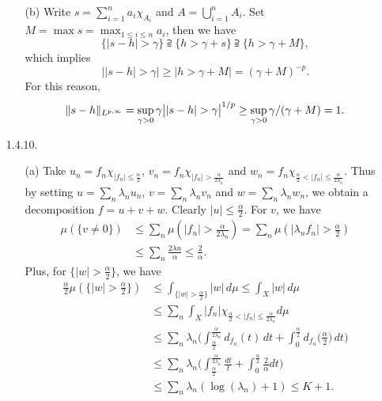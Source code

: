 \begin{enumerate}
\begin{enumerate}
   \item[(b)] Write $s= \sum_{i=1}^{n}a_{i}\chi_{A_{i}}$ and $A=\bigcup_{i=1}^{n}A_{i}$. 
   Set $M=\max s=\max_{1\le i\le n}{a_{i}}$, then we have 
   \[\{|s-h|>\gamma\}\supseteqq\{h>\gamma+s\}\supseteqq\{h>\gamma+M\},\]
   which implies
   \[\big||s-h|>\gamma\big|\ge\big|h>\gamma+M\big|=(\gamma+M)^{-p}.\]
   For this reason,
   \[\norm{s-h}_{L^{p,\infty}} = \sup_{\gamma > 0} \gamma \big||s-h|>\gamma\big|^{1/p}
   \ge \sup_{\gamma > 0} \gamma/(\gamma+M)=1.\]
   \end{enumerate}

\item[1.4.10.]
   \begin{enumerate}
   \item[(a)] Take $u_{n}=f_{n}\chi_{|f_{n}|\leq\frac{\alpha}{2}}$, 
   $v_{n}=f_{n}\chi_{|f_{n}|>\frac{\alpha}{2\lambda_{n}}}$ 
   and $w_{n}=f_{n}\chi_{\frac{\alpha}{2}<|f_{n}|\leq\frac{\alpha}{2\lambda_{n}}}$. 
   Thus by setting $u=\sum_{n}\lambda_{n}u_{n}$, $v=\sum_{n}\lambda_{n}v_{n}$ 
   and $w=\sum_{n}\lambda_{n}w_{n}$, we obtain a decomposition $f=u+v+w$. 
   Clearly $|u|\leq\frac{\alpha}{2}$. For $v$, we have
   \begin{equation*}\begin{aligned}
   \mu(\{v \neq 0\}) &\leq \sum_{n}\mu(|f_{n}|>\frac{\alpha}{2\lambda_{n}}) 
   = \sum_{n}\mu(|\lambda_{n}f_{n}|>\frac{\alpha}{2})\\
   &\leq \sum_{n} \frac{2\lambda{n}}{\alpha} \leq \frac{2}{\alpha}.
   \end{aligned}\end{equation*}
   Plus, for $\{|w|>\frac{\alpha}{2}\}$, we have 
   \begin{equation*}\begin{aligned}
   \frac{\alpha}{2}\mu(\{|w|>\frac{\alpha}{2}\}) 
   &\leq \int_{\{|w|>\frac{\alpha}{2}\}}|w|\,d\mu \leq \int_{X}|w|\,d\mu\\
   &\leq \sum_{n}\int_{X}|f_{n}|\chi_{\frac{\alpha}{2}<|f_{n}|\leq\frac{\alpha}{2\lambda_{n}}}d\mu\\
   &\leq \sum_{n}\lambda_{n}\bigg(
   \int_{\frac{\alpha}{2}}^{\frac{\alpha}{2\lambda_{n}}}d_{f_{n}}(t)\,dt 
   + \int_{0}^{\frac{\alpha}{2}}d_{f_{n}}\Big(\frac{\alpha}{2}\Big)\,dt\bigg)\\
   &\leq \sum_{n}\lambda_{n}\bigg(
   \int_{\frac{\alpha}{2}}^{\frac{\alpha}{2\lambda_{n}}}\frac{dt}{t} 
   + \int_{0}^{\frac{\alpha}{2}}\frac{2}{\alpha}dt\bigg)\\
   &\leq \sum_{n}\lambda_{n}(\log(\lambda_{n})+1) \leq K+1.

\end{aligned}
\end{equation*}
\end{enumerate}
\end{enumerate}
